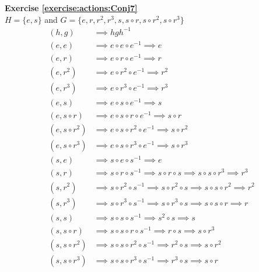 \noindent\textbf{Exercise \ref{exercise:actions:Conj7}}
\\
$H = \{e, s\}$ and $G = \{e, r, r^2, r^3, s, s \circ r, s \circ r^2, s \circ r^3\}$
\begin{align*}
(h, g) &\implies hgh^{-1}
\\
(e, e) &\implies e \circ e \circ e^{-1} \implies e
\\
(e, r) &\implies e \circ r \circ e^{-1} \implies r
\\
(e, r^2) &\implies e \circ r^2 \circ e^{-1} \implies r^2
\\
(e, r^3) &\implies e \circ r^3 \circ e^{-1} \implies r^3
\\
(e, s) &\implies e \circ s \circ e^{-1} \implies s
\\
(e, s \circ r) &\implies e \circ s \circ r \circ e^{-1} \implies s \circ r
\\
(e, s \circ r^2) &\implies e \circ s \circ r^2 \circ e^{-1} \implies s \circ r^2
\\
(e, s \circ r^3) &\implies e \circ s \circ r^3 \circ e^{-1} \implies s \circ r^3
\\
(s, e) &\implies s \circ e \circ s^{-1} \implies e
\\
(s, r) &\implies s \circ r \circ s^{-1} \implies s \circ r \circ s \implies s \circ s \circ r^3 \implies r^3
\\
(s, r^2) &\implies s \circ r^2 \circ s^{-1} \implies s \circ r^2 \circ s \implies s \circ s \circ r^2 \implies r^2
\\
(s, r^3) &\implies s \circ r^3 \circ s^{-1} \implies s \circ r^3 \circ s \implies s \circ s \circ r \implies r
\\
(s, s) &\implies s \circ s \circ s^{-1} \implies s^2 \circ s \implies s
\\
(s, s \circ r) &\implies s \circ s \circ r \circ s^{-1} \implies r \circ s \implies s \circ r^3
\\
(s, s \circ r^2) &\implies s \circ s \circ r^2 \circ s^{-1} \implies r^2 \circ s \implies s \circ r^2
\\
(s, s \circ r^3) &\implies s \circ s \circ r^3 \circ s^{-1} \implies r^3 \circ s \implies s \circ r
\end{align*}

